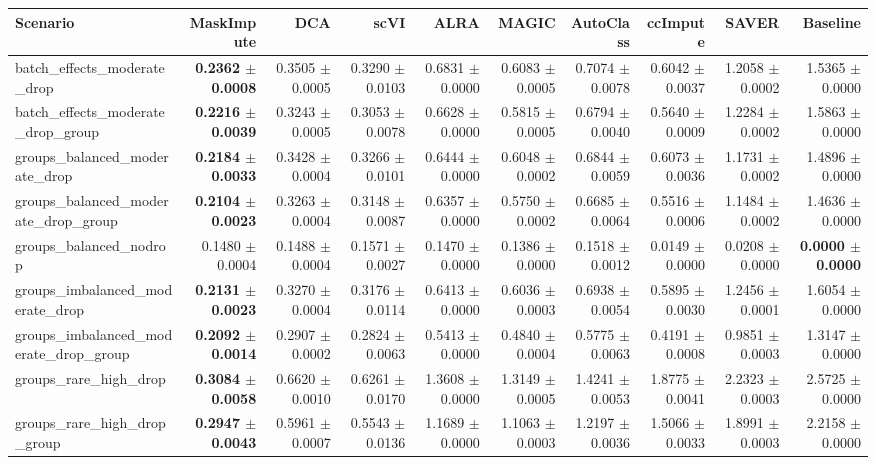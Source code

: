 \begin{tabular}{@{}lrrrrrrrrr@{}}
\toprule
Scenario & MaskImpute & DCA & scVI & ALRA & MAGIC & AutoClass & ccImpute & SAVER & Baseline \\
\midrule
batch\_effects\_moderate\_drop & \textbf{0.2362 $\pm$ 0.0008} & 0.3505 $\pm$ 0.0005 & 0.3290 $\pm$ 0.0103 & 0.6831 $\pm$ 0.0000 & 0.6083 $\pm$ 0.0005 & 0.7074 $\pm$ 0.0078 & 0.6042 $\pm$ 0.0037 & 1.2058 $\pm$ 0.0002 & 1.5365 $\pm$ 0.0000 \\
batch\_effects\_moderate\_drop\_group & \textbf{0.2216 $\pm$ 0.0039} & 0.3243 $\pm$ 0.0005 & 0.3053 $\pm$ 0.0078 & 0.6628 $\pm$ 0.0000 & 0.5815 $\pm$ 0.0005 & 0.6794 $\pm$ 0.0040 & 0.5640 $\pm$ 0.0009 & 1.2284 $\pm$ 0.0002 & 1.5863 $\pm$ 0.0000 \\
groups\_balanced\_moderate\_drop & \textbf{0.2184 $\pm$ 0.0033} & 0.3428 $\pm$ 0.0004 & 0.3266 $\pm$ 0.0101 & 0.6444 $\pm$ 0.0000 & 0.6048 $\pm$ 0.0002 & 0.6844 $\pm$ 0.0059 & 0.6073 $\pm$ 0.0036 & 1.1731 $\pm$ 0.0002 & 1.4896 $\pm$ 0.0000 \\
groups\_balanced\_moderate\_drop\_group & \textbf{0.2104 $\pm$ 0.0023} & 0.3263 $\pm$ 0.0004 & 0.3148 $\pm$ 0.0087 & 0.6357 $\pm$ 0.0000 & 0.5750 $\pm$ 0.0002 & 0.6685 $\pm$ 0.0064 & 0.5516 $\pm$ 0.0006 & 1.1484 $\pm$ 0.0002 & 1.4636 $\pm$ 0.0000 \\
groups\_balanced\_nodrop & 0.1480 $\pm$ 0.0004 & 0.1488 $\pm$ 0.0004 & 0.1571 $\pm$ 0.0027 & 0.1470 $\pm$ 0.0000 & 0.1386 $\pm$ 0.0000 & 0.1518 $\pm$ 0.0012 & 0.0149 $\pm$ 0.0000 & 0.0208 $\pm$ 0.0000 & \textbf{0.0000 $\pm$ 0.0000} \\
groups\_imbalanced\_moderate\_drop & \textbf{0.2131 $\pm$ 0.0023} & 0.3270 $\pm$ 0.0004 & 0.3176 $\pm$ 0.0114 & 0.6413 $\pm$ 0.0000 & 0.6036 $\pm$ 0.0003 & 0.6938 $\pm$ 0.0054 & 0.5895 $\pm$ 0.0030 & 1.2456 $\pm$ 0.0001 & 1.6054 $\pm$ 0.0000 \\
groups\_imbalanced\_moderate\_drop\_group & \textbf{0.2092 $\pm$ 0.0014} & 0.2907 $\pm$ 0.0002 & 0.2824 $\pm$ 0.0063 & 0.5413 $\pm$ 0.0000 & 0.4840 $\pm$ 0.0004 & 0.5775 $\pm$ 0.0063 & 0.4191 $\pm$ 0.0008 & 0.9851 $\pm$ 0.0003 & 1.3147 $\pm$ 0.0000 \\
groups\_rare\_high\_drop & \textbf{0.3084 $\pm$ 0.0058} & 0.6620 $\pm$ 0.0010 & 0.6261 $\pm$ 0.0170 & 1.3608 $\pm$ 0.0000 & 1.3149 $\pm$ 0.0005 & 1.4241 $\pm$ 0.0053 & 1.8775 $\pm$ 0.0041 & 2.2323 $\pm$ 0.0003 & 2.5725 $\pm$ 0.0000 \\
groups\_rare\_high\_drop\_group & \textbf{0.2947 $\pm$ 0.0043} & 0.5961 $\pm$ 0.0007 & 0.5543 $\pm$ 0.0136 & 1.1689 $\pm$ 0.0000 & 1.1063 $\pm$ 0.0003 & 1.2197 $\pm$ 0.0036 & 1.5066 $\pm$ 0.0033 & 1.8991 $\pm$ 0.0003 & 2.2158 $\pm$ 0.0000 \\

\end{tabular}
